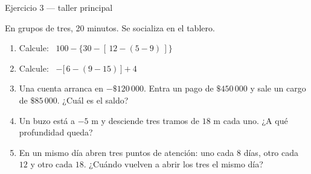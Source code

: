 \documentclass[aspectratio=169,10pt]{beamer}
\begin{document}
	\begin{frame}{Ejercicio 3 — taller principal}
		\begin{alertblock}{En grupos de tres, 20 minutos. Se socializa en el tablero.}
			\scriptsize
			\begin{enumerate}\setlength{\itemsep}{0.02cm}
				\item Calcule: \ $100 - \big\{30 - [\,12 - (5-9)\,]\big\}$
				\item Calcule: \ $-\big[\,6 - (9-15)\,\big] + 4$
				\item Una cuenta arranca en $-\$120\,000$. Entra un pago de
				$\$450\,000$ y sale un cargo de $\$85\,000$. ¿Cuál es el saldo?
				\item Un buzo está a $-5$ m y desciende tres tramos de $18$ m cada uno.
				¿A qué profundidad queda?
				\item En un mismo día abren tres puntos de atención: uno cada $8$ días,
				otro cada $12$ y otro cada $18$. ¿Cuándo vuelven a abrir los tres
				el mismo día?
			\end{enumerate}
		\end{alertblock}
	\end{frame}
	
\end{document}
